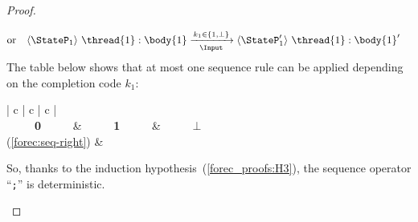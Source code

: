 \begin{proof}
\begin{enumerate}
\begin{align*}
				  \text{or} \quad
				  \langle \StateP_1 \rangle ~ \thread{1}:\body{1} 
				  &	\xrightarrow[~~\Input~~]{k_1 \in \lbrace 1, \bot \rbrace} 
				  \langle \StateP_1' \rangle ~ \thread{1}:\body{1}'
			  \end{align*}
			  The table below shows that at most one sequence rule can be 
			  applied depending on the completion code $k_1$:
			  \begin{center}
			  	\def\arraystretch{1.3}
				\begin{tabular}{| c | c | c |}
					\hline
															\\ 
					~~~~~\textbf{0}~~~~~	& ~~~~~\textbf{1}~~~~~	& ~~~~~\boldmath$\bot$~~~~~	\\ \hline 
					(\ref{forec:seq-right})	& 		\\
					\hline
				\end{tabular}
			  \end{center}
			  So, thanks to the induction hypothesis~(\ref{forec_proofs:H3}), 
			  the sequence operator ``\texttt{;}'' is deterministic.
			  

\end{enumerate}
\end{proof}

